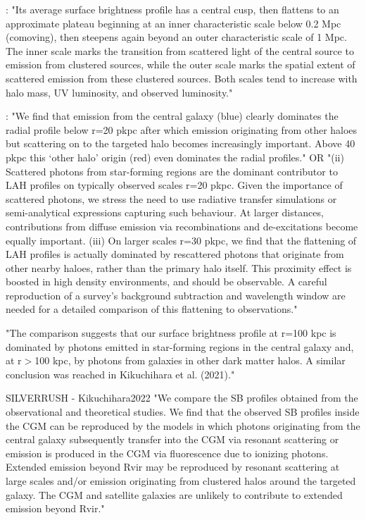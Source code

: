 \documentclass[linenumbers,amsmath,trackchanges,preprint2]{aastex702}
\begin{document}
\cite{zheng2011}:
"Its average surface brightness profile has a central cusp, then flattens to an approximate plateau beginning at an inner characteristic scale below 0.2 Mpc (comoving), then steepens again beyond an outer characteristic scale of 1 Mpc. The inner scale marks the transition from scattered light of the central source to emission from clustered sources, while the outer scale marks the spatial extent of scattered emission from these clustered sources. Both scales tend to increase with halo mass, UV luminosity, and observed \lya luminosity."

\cite{byrohl2021}:
"We find that emission from the central galaxy (blue) clearly dominates the radial profile below r=20 pkpc after which emission originating from other haloes but scattering on to the targeted halo becomes increasingly important. Above 40 pkpc this ‘other halo’ origin (red) even dominates the radial profiles."
OR
"(ii) Scattered photons from star-forming regions are the dominant contributor to LAH profiles on typically observed scales r=20 pkpc. Given the importance of scattered photons, we stress the need to use radiative transfer simulations or semi-analytical expressions capturing such behaviour. At larger distances, contributions from diffuse emission via recombinations and de-excitations become equally important. (iii) On larger scales r=30 pkpc, we find that the flattening of LAH profiles is actually dominated by rescattered photons that originate from other nearby haloes, rather than the primary halo itself. This proximity effect is boosted in high density environments, and should be observable. A careful reproduction of a survey’s background subtraction and wavelength window are needed for a detailed comparison of this flattening to observations."

\cite{niemeyer2022hetdex}
"The comparison suggests that our surface brightness profile at r=100 kpc is dominated by photons emitted in star-forming regions in the central galaxy and, at r$>$100 kpc, by photons from galaxies in other dark matter halos. A similar conclusion was reached in Kikuchihara et al. (2021)."

SILVERRUSH - Kikuchihara2022
"We compare the \lya SB profiles obtained from the
observational and theoretical studies. We find that the
observed \lya SB profiles inside the CGM can be reproduced
by the models in which \lya photons originating from the
central galaxy subsequently transfer into the CGM via
resonant scattering or \lya emission is produced in the
CGM via fluorescence due to ionizing photons. Extended
\lya emission beyond Rvir may be reproduced by resonant
scattering at large scales and/or emission originating from
clustered halos around the targeted galaxy. The CGM and
satellite galaxies are unlikely to contribute to extended \lya emission beyond Rvir."
\end{document}

